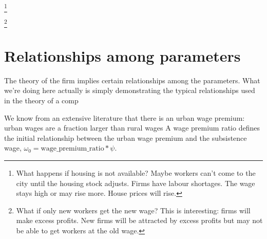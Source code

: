 \footnote{What happens if housing is not available? Maybe workers can't come to the city until the housing stock adjusts. Firms have labour shortages.  The wage stays high or may rise more. House prices will rise.} 

\footnote{What if only new workers get the new wage? This is interesting: firms will make excess profits. New firms will be attracted by excess profits but may not be able to get workers at the old wage.}




{\color{red}
\section{Relationships among parameters} \label{section-firm-initial-values}





The theory of the firm implies certain relationships among the parameters. What we're doing here actually is simply demonstrating the typical relationships used in the theory of a comp}


We know from an extensive  literature that there is an urban wage premium: urban wages are a fraction larger than  rural wages A wage premium ratio defines the initial relationship between the urban wage premium and the subsistence wage, $\omega_0 = \mathrm{wage\_premium\_ratio} * \psi$. %

